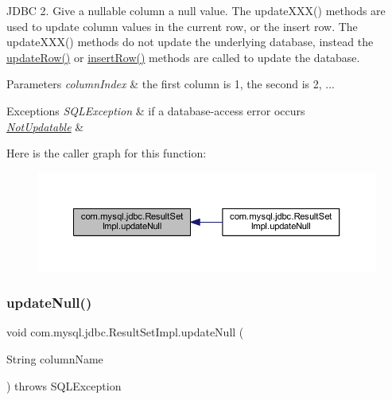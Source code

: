 J\+D\+BC 2. Give a nullable column a null value. The update\+X\+X\+X() methods are used to update column values in the current row, or the insert row. The update\+X\+X\+X() methods do not update the underlying database, instead the \mbox{\hyperlink{classcom_1_1mysql_1_1jdbc_1_1_result_set_impl_a2842d32292d023aaeeafedeed3322981}{update\+Row()}} or \mbox{\hyperlink{classcom_1_1mysql_1_1jdbc_1_1_result_set_impl_a78e304e3279cbcf60392f18c1385e3bf}{insert\+Row()}} methods are called to update the database.


\begin{DoxyParams}{Parameters}
{\em column\+Index} & the first column is 1, the second is 2, ...\\
\hline
\end{DoxyParams}

\begin{DoxyExceptions}{Exceptions}
{\em S\+Q\+L\+Exception} & if a database-\/access error occurs \\
\hline
{\em \mbox{\hyperlink{classcom_1_1mysql_1_1jdbc_1_1_not_updatable}{Not\+Updatable}}} & \\
\hline
\end{DoxyExceptions}
Here is the caller graph for this function\+:
\nopagebreak
\begin{figure}[H]
\begin{center}
\leavevmode
\includegraphics[width=350pt]{classcom_1_1mysql_1_1jdbc_1_1_result_set_impl_adf55d3276cbb5778d9e53af63e7670b9_icgraph}
\end{center}
\end{figure}
\mbox{\label{classcom_1_1mysql_1_1jdbc_1_1_result_set_impl_ad2f7b1a741e031324edf8760de259369}} 
\subsubsection{\texorpdfstring{update\+Null()}{updateNull()}\hspace{0.1cm}{\footnotesize\ttfamily [2/2]}}
{\footnotesize\ttfamily void com.\+mysql.\+jdbc.\+Result\+Set\+Impl.\+update\+Null (\begin{DoxyParamCaption}\item[{String}]{column\+Name }\end{DoxyParamCaption}) throws S\+Q\+L\+Exception}

